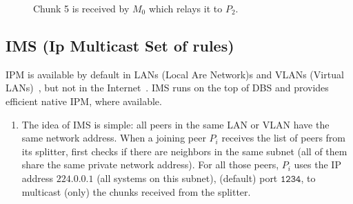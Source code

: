 \begin{center}
  \begin{figure}
     \caption{Chunk 5 is received by
      $M_0$ which relays it to $P_2$.\label{fig:team_4}}
  \end{figure}

  \begin{figure*}
  \end{figure*}
  
  \begin{figure*}
  \end{figure*}
  
  \begin{figure*}
  \end{figure*}
  
  \begin{figure*}
  \end{figure*}
  
  \begin{figure*}
  \end{figure*}
  
  \begin{figure*}
  \end{figure*}
  
  \begin{figure*}
  \end{figure*}
  
  \begin{figure*}
  \end{figure*}
  
  \begin{figure*}
  \end{figure*}

\end{center}

\subsection{IMS (Ip Multicast Set of rules)}
IPM is available by default in LANs (Local Are Network)s and VLANs
(Virtual LANs)~\cite{shabtay2011ip}, but not in the
Internet~\cite{Comer1}. IMS runs on the top of DBS and provides
efficient native IPM, where available.

\begin{enumerate}
\item The idea of IMS is simple: all peers in the same LAN or VLAN
  have the same network address. When a joining peer $P_i$ receives
  the list of peers from its splitter, first checks if there are
  neighbors in the same subnet (all of them share the same private
  network address). For all those peers, $P_i$ uses the IP address
  $\mathtt{224.0.0.1}$ (all systems on this subnet), (default) port
  $\mathtt{1234}$, to multicast (only) the chunks received from the
  splitter.
\end{enumerate}

